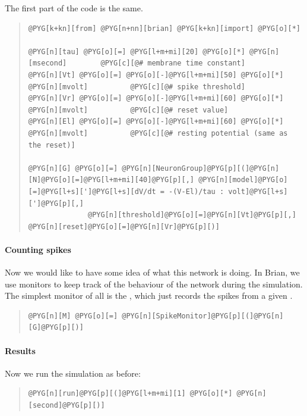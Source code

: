 \documentclass[letterpaper,10pt,english]{manual}
\begin{document}
The first part of the code is the same.
\begin{quote}

\begin{Verbatim}[commandchars=@\[\]]
@PYG[k+kn][from] @PYG[n+nn][brian] @PYG[k+kn][import] @PYG[o][*]

@PYG[n][tau] @PYG[o][=] @PYG[l+m+mi][20] @PYG[o][*] @PYG[n][msecond]        @PYG[c][@# membrane time constant]
@PYG[n][Vt] @PYG[o][=] @PYG[o][-]@PYG[l+m+mi][50] @PYG[o][*] @PYG[n][mvolt]          @PYG[c][@# spike threshold]
@PYG[n][Vr] @PYG[o][=] @PYG[o][-]@PYG[l+m+mi][60] @PYG[o][*] @PYG[n][mvolt]          @PYG[c][@# reset value]
@PYG[n][El] @PYG[o][=] @PYG[o][-]@PYG[l+m+mi][60] @PYG[o][*] @PYG[n][mvolt]          @PYG[c][@# resting potential (same as the reset)]

@PYG[n][G] @PYG[o][=] @PYG[n][NeuronGroup]@PYG[p][(]@PYG[n][N]@PYG[o][=]@PYG[l+m+mi][40]@PYG[p][,] @PYG[n][model]@PYG[o][=]@PYG[l+s][']@PYG[l+s][dV/dt = -(V-El)/tau : volt]@PYG[l+s][']@PYG[p][,]
              @PYG[n][threshold]@PYG[o][=]@PYG[n][Vt]@PYG[p][,] @PYG[n][reset]@PYG[o][=]@PYG[n][Vr]@PYG[p][)]
\end{Verbatim}
\end{quote}


\paragraph{Counting spikes}

Now we would like to have some idea of what this network is
doing. In Brian, we use monitors to keep track of the behaviour
of the network during the simulation. The simplest monitor of
all is the \hyperlink{brian.SpikeMonitor}{}, which just records the spikes from a
given \hyperlink{brian.NeuronGroup}{}.
\begin{quote}

\begin{Verbatim}[commandchars=@\[\]]
@PYG[n][M] @PYG[o][=] @PYG[n][SpikeMonitor]@PYG[p][(]@PYG[n][G]@PYG[p][)]
\end{Verbatim}
\end{quote}


\paragraph{Results}

Now we run the simulation as before:
\begin{quote}

\begin{Verbatim}[commandchars=@\[\]]
@PYG[n][run]@PYG[p][(]@PYG[l+m+mi][1] @PYG[o][*] @PYG[n][second]@PYG[p][)]
\end{Verbatim}
\end{quote}
\end{document}

